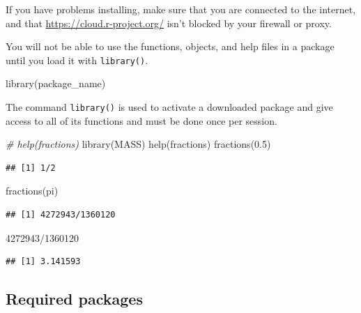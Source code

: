\documentclass[
]{book}
\newenvironment{Shaded}{\begin{snugshade}}{\end{snugshade}}
\newcommand{\CommentTok}[1]{\textcolor[rgb]{0.56,0.35,0.01}{\textit{#1}}}
\newcommand{\DecValTok}[1]{\textcolor[rgb]{0.00,0.00,0.81}{#1}}
\newcommand{\FloatTok}[1]{\textcolor[rgb]{0.00,0.00,0.81}{#1}}
\newcommand{\FunctionTok}[1]{\textcolor[rgb]{0.00,0.00,0.00}{#1}}
\newcommand{\NormalTok}[1]{#1}
\newcommand{\SpecialCharTok}[1]{\textcolor[rgb]{0.00,0.00,0.00}{#1}}
\begin{document}
If you have problems installing, make sure that you are connected to the internet, and that \url{https://cloud.r-project.org/} isn't blocked by your firewall or proxy.

You will not be able to use the functions, objects, and help files in a package until you load it with \texttt{library()}.

\begin{Shaded}
\begin{Highlighting}[]
\FunctionTok{library}\NormalTok{(package\_name)}
\end{Highlighting}
\end{Shaded}

The command \texttt{library()} is used to activate a downloaded package and give access to all of its functions and must be done once per session.

\begin{Shaded}
\begin{Highlighting}[]
\CommentTok{\# help(fractions)}
\FunctionTok{library}\NormalTok{(MASS)}
\FunctionTok{help}\NormalTok{(fractions)}
\FunctionTok{fractions}\NormalTok{(}\FloatTok{0.5}\NormalTok{)}
\end{Highlighting}
\end{Shaded}

\begin{verbatim}
## [1] 1/2
\end{verbatim}

\begin{Shaded}
\begin{Highlighting}[]
\FunctionTok{fractions}\NormalTok{(pi)}
\end{Highlighting}
\end{Shaded}

\begin{verbatim}
## [1] 4272943/1360120
\end{verbatim}

\begin{Shaded}
\begin{Highlighting}[]
\DecValTok{4272943}\SpecialCharTok{/}\DecValTok{1360120}
\end{Highlighting}
\end{Shaded}

\begin{verbatim}
## [1] 3.141593
\end{verbatim}

\hypertarget{required-packages}{%
\subsection*{Required packages}\label{required-packages}}
\end{document}
